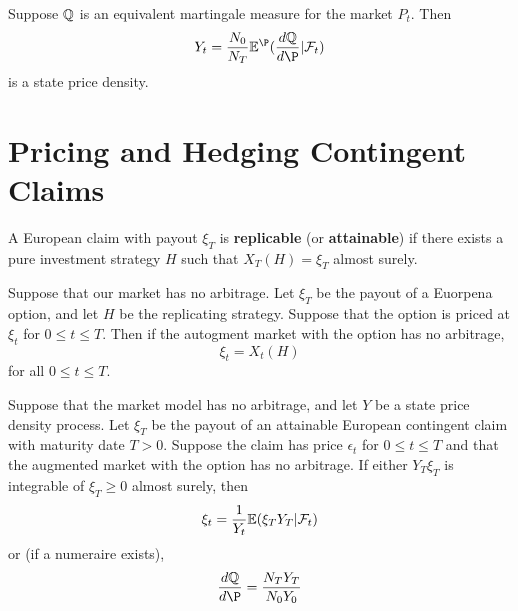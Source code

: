 \begin{defn}
  \label{sec:arbitrage-theory-22}
  Suppose $\Q$ is an equivalent martingale measure for the market
  $P_{t}$. Then
  \begin{equation}
    \label{eq:5}
    Y_{t} = \frac{N_{0}}{N_{T}}  \E^{\P}(\frac{d\Q}{d\P} | \mathcal{F}_{t})
  \end{equation} is a state price density.
\end{defn}

\section{Pricing and Hedging Contingent Claims}
\label{sec:pric-hedg-cont}

\begin{defn}
  \label{sec:pric-hedg-cont-1}
  A European claim with payout $\xi_{T}$ is \textbf{replicable} (or
  \textbf{attainable}) if there exists a pure investment strategy $H$
  such that $X_{T}(H) = \xi_{T}$ almost surely.
\end{defn}

\begin{thm}
  \label{sec:pric-hedg-cont-3}
  Suppose that our market has no arbitrage.  Let $\xi_{T}$ be the
  payout of a Euorpena option, and let $H$ be the replicating strategy.
  Suppose that the option is priced at $\xi_{t}$ for $0 \leq t \leq
  T$.  Then if the autogment market with the option has no arbitrage,
  \begin{equation}
    \label{eq:7}
    \xi_{t} = X_{t}(H)
  \end{equation} for all $0 \leq t \leq T$.
\end{thm}

\begin{thm}
  \label{sec:pric-hedg-cont-4}
  Suppose that the market model has no arbitrage, and let $Y$ be a
  state price density process. Let $\xi_{T}$ be the payout of an
  attainable European contingent claim with maturity date $T > 0$.
  Suppose the claim has price $\epsilon_{t}$ for $0 \leq t \leq T$ and
  that the augmented market with the option has no arbitrage.  If
  either $Y_{T} \xi_{T}$ is integrable of $\xi_{T} \geq 0$ almost
  surely, then
  \begin{align}
    \label{eq:8}
    \xi_{t} = \frac{1}{Y_{t}} \E{\xi_{T} Y_{T} | \mathcal{F}_{t}}
  \end{align} or (if a numeraire exists),
  \begin{align}
    \label{eq:9}
    \frac{d\Q}{d\P} = \frac{N_{T} Y_{T}}{N_{0} Y_{0}}
  \end{align}
\end{thm}

